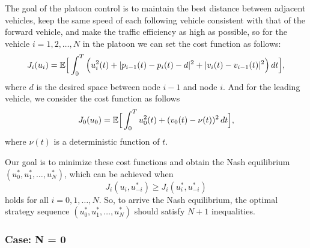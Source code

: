 \documentclass{article}
\begin{document}
The goal of the platoon control is to maintain the best distance between adjacent vehicles, keep the same speed of each following vehicle consistent with that of the forward vehicle, and make the traffic efficiency as high as possible, so for the vehicle $i = 1, 2, \dots, N$ in the platoon we can set the cost function as follows:
\begin{equation} \label{eq: cost function2}
    J_{i} (u_{i}) = \mathbb{E} \Big{[} \int_{0}^{T} \Big{(} u_{i}^{2}(t) + |p_{i-1}(t) - p_{i}(t) - d|^{2} + |v_{i}(t) - v_{i - 1}(t)|^{2} \Big{)} \, d t \Big{]},
\end{equation}
where $d$ is the desired space between node $i-1$ and node $i$. And for the leading vehicle, we consider the cost function as follows
\begin{equation} \label{eq: cost function1}
    J_{0} (u_{0}) = \mathbb{E} \Big{[} \int_{0}^{T}  u_{0}^{2}(t) + (v_{0}(t) - \nu(t))^{2} \, d t \Big{]},
\end{equation}
where $\nu(t)$ is a deterministic function of $t$.

Our goal is to minimize these cost functions and obtain the Nash equilibrium $(u_{0}^{*}, u_{1}^{*}, \dots, u_{N}^{*})$, which can be achieved when 
\begin{equation*}
    J_{i}(u_{i}, u_{-i}^{*}) \geq J_{i}(u_{i}^{*}, u_{-i}^{*})
\end{equation*}
holds for all $i = 0, 1, \dots, N$. So, to arrive the Nash equilibrium, the optimal strategy sequence $(u_{0}^{*}, u_{1}^{*}, \dots, u_{N}^{*})$ should satisfy $N+1$ inequalities. 

\subsubsection{Case: N = 0}
\end{document}
